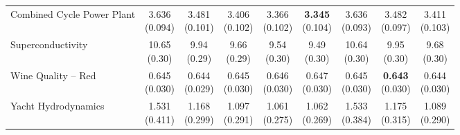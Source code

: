 {\begin{longtable}{lcccccccc}
Combined Cycle Power Plant & \makecell{3.636\\{\tiny (0.094)}} & \makecell{3.481\\{\tiny (0.101)}} & \makecell{3.406\\{\tiny (0.102)}} & \makecell{3.366\\{\tiny (0.102)}} & \makecell{\textbf{3.345}\\{\tiny (0.104)}} & \makecell{3.636\\{\tiny (0.093)}} & \makecell{3.482\\{\tiny (0.097)}} & \makecell{3.411\\{\tiny (0.103)}} \\
Superconductivity & \makecell{10.65\\{\tiny (0.30)}} & \makecell{9.94\\{\tiny (0.29)}} & \makecell{9.66\\{\tiny (0.29)}} & \makecell{9.54\\{\tiny (0.30)}} & \makecell{9.49\\{\tiny (0.30)}} & \makecell{10.64\\{\tiny (0.30)}} & \makecell{9.95\\{\tiny (0.30)}} & \makecell{9.68\\{\tiny (0.30)}} \\
Wine Quality -- Red & \makecell{0.645\\{\tiny (0.030)}} & \makecell{0.644\\{\tiny (0.029)}} & \makecell{0.645\\{\tiny (0.030)}} & \makecell{0.646\\{\tiny (0.030)}} & \makecell{0.647\\{\tiny (0.030)}} & \makecell{0.645\\{\tiny (0.030)}} & \makecell{\textbf{0.643}\\{\tiny (0.030)}} & \makecell{0.644\\{\tiny (0.030)}} \\
Yacht Hydrodynamics & \makecell{1.531\\{\tiny (0.411)}} & \makecell{1.168\\{\tiny (0.299)}} & \makecell{1.097\\{\tiny (0.291)}} & \makecell{1.061\\{\tiny (0.275)}} & \makecell{1.062\\{\tiny (0.269)}} & \makecell{1.533\\{\tiny (0.384)}} & \makecell{1.175\\{\tiny (0.315)}} & \makecell{1.089\\{\tiny (0.290)}} \\
\bottomrule
\end{longtable}}

